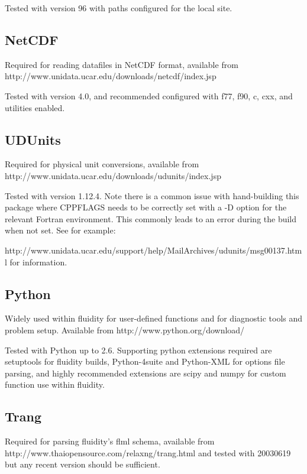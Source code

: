 Tested with version 96 with paths configured for the local site.

\subsection{NetCDF}
\label{sect:required_libraries_netcdf}

Required for reading datafiles in NetCDF format, available from
http://www.unidata.ucar.edu/downloads/netcdf/index.jsp

Tested with version 4.0, and recommended configured with f77, f90, c, cxx, and
utilities enabled.

\subsection{UDUnits}
\label{sect:required_libraries_udunits}

Required for physical unit conversions, available from
http://www.unidata.ucar.edu/downloads/udunits/index.jsp

Tested with version 1.12.4. Note there is a common issue with hand-building
this package where CPPFLAGS needs to be correctly set with a -D option for the
relevant Fortran environment. This commonly leads to an error during the build
when not set. See for example:

http://www.unidata.ucar.edu/support/help/MailArchives/udunits/msg00137.html
for information.

\subsection{Python}
\label{sect:required_libraries_python}

Widely used within fluidity for user-defined functions and for diagnostic tools and
problem setup. Available from http://www.python.org/download/

Tested with Python up to 2.6. Supporting python extensions required are
setuptools for fluidity builds, Python-4suite and Python-XML for options file
parsing, and highly recommended extensions are scipy and numpy for custom
function use within fluidity.

\subsection{Trang}
\label{sect:required_libraries_trang}

Required for parsing fluidity's flml schema, available from
http://www.thaiopensource.com/relaxng/trang.html and tested with 20030619 but
any recent version should be sufficient.

